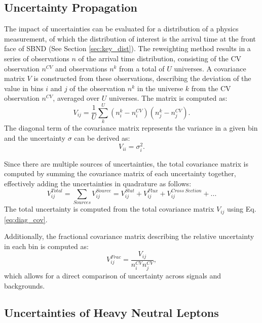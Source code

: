 \subsection{Uncertainty Propagation}
\label{sec:error_prop}

The impact of uncertainties can be evaluated for a distribution of a physics measurement, of which the distribution of interest is the arrival time at the front face of SBND (See Section \ref{sec:key_dist}).
The reweighting method results in a series of observations $n$ of the arrival time distribution, consisting of the CV observation $n^{CV}$ and observations $n^k$ from a total of $U$ universes.
A covariance matrix $V$ is constructed from these observations, describing the deviation of the value in bins $i$ and $j$ of the observation $n^k$ in the universe $k$ from the CV observation $n^{CV}$, averaged over $U$ universes.
The matrix is computed as:
\begin{equation}
	V_{ij} = \frac{1}{U}\sum^{U}_{k} \left( n^k_{i} - n^{CV}_{i} \right) \left( n^k_{j} - n^{CV}_{j} \right).
\end{equation}
The diagonal term of the covariance matrix represents the variance in a given bin and the uncertainty $\sigma$ can be derived as:
\begin{equation}
\label{eq:diag_cov}
	V_{ii} = \sigma^2_i.
\end{equation}

Since there are multiple sources of uncertainties, the total covariance matrix is computed by summing the covariance matrix of each uncertainty together, effectively adding the uncertainties in quadrature as follows:
\begin{equation}
	V^{Total}_{ij} = \sum_{Sources} V_{ij}^{Source} = V_{ij}^{Stat} + V_{ij}^{Flux} +V_{ij}^{Cross\ Section} + ...
\end{equation}
The total uncertainty is computed from the total covariance matrix $V_{ij}$ using Eq. \ref{eq:diag_cov}.

Additionally, the fractional covariance matrix describing the relative uncertainty in each bin is computed as:  
\begin{equation}
	V_{ij}^{Frac} = \frac{V_{ij}}{n_i^{CV}n_j^{CV}},
\end{equation}
which allows for a direct comparison of uncertainty across signals and backgrounds.

\subsection{Uncertainties of Heavy Neutral Leptons}
\label{sec:signal_error}

